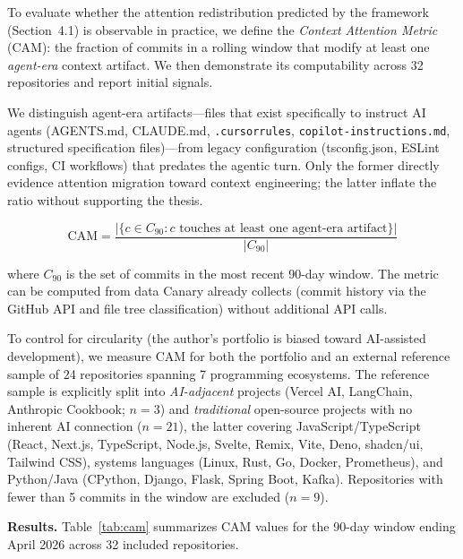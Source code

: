 \documentclass[sigconf, nonacm, anonymous=false]{acmart}
\begin{document}
To evaluate whether the attention redistribution predicted by the framework (Section~4.1) is observable in practice, we define the \textit{Context Attention Metric} (CAM): the fraction of commits in a rolling window that modify at least one \textit{agent-era} context artifact. We then demonstrate its computability across 32 repositories and report initial signals.

We distinguish agent-era artifacts---files that exist specifically to instruct AI agents (AGENTS.md, CLAUDE.md, \texttt{.cursorrules}, \texttt{copilot-instructions.md}, structured specification files)---from legacy configuration (tsconfig.json, ESLint configs, CI workflows) that predates the agentic turn. Only the former directly evidence attention migration toward context engineering; the latter inflate the ratio without supporting the thesis.

\begin{equation}
\text{CAM} = \frac{|\{c \in C_{90} : c \text{ touches at least one agent-era artifact}\}|}{|C_{90}|}
\end{equation}

\noindent where $C_{90}$ is the set of commits in the most recent 90-day window. The metric can be computed from data Canary already collects (commit history via the GitHub API and file tree classification) without additional API calls.

To control for circularity (the author's portfolio is biased toward AI-assisted development), we measure CAM for both the portfolio and an external reference sample of 24 repositories spanning 7 programming ecosystems. The reference sample is explicitly split into \textit{AI-adjacent} projects (Vercel AI, LangChain, Anthropic Cookbook; $n=3$) and \textit{traditional} open-source projects with no inherent AI connection ($n=21$), the latter covering JavaScript/TypeScript (React, Next.js, TypeScript, Node.js, Svelte, Remix, Vite, Deno, shadcn/ui, Tailwind CSS), systems languages (Linux, Rust, Go, Docker, Prometheus), and Python/Java (CPython, Django, Flask, Spring Boot, Kafka). Repositories with fewer than 5 commits in the window are excluded ($n=9$).

\textbf{Results.} Table~\ref{tab:cam} summarizes CAM values for the 90-day window ending April 2026 across 32 included repositories.
\end{document}
